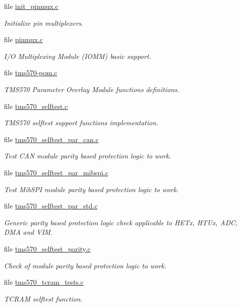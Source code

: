 \begin{DoxyCompactItemize}
file \mbox{\hyperlink{init__pinmux_8c}{init\+\_\+pinmux.\+c}}
\begin{DoxyCompactList}\small\item\em Initialize pin multiplexers. \end{DoxyCompactList}\item 
file \mbox{\hyperlink{pinmux_8c}{pinmux.\+c}}
\begin{DoxyCompactList}\small\item\em I/O Multiplexing Module (I\+O\+MM) basic support. \end{DoxyCompactList}\item 
file \mbox{\hyperlink{tms570-pom_8c}{tms570-\/pom.\+c}}
\begin{DoxyCompactList}\small\item\em T\+M\+S570 Parameter Overlay Module functions definitions. \end{DoxyCompactList}\item 
file \mbox{\hyperlink{tms570__selftest_8c}{tms570\+\_\+selftest.\+c}}
\begin{DoxyCompactList}\small\item\em T\+M\+S570 selftest support functions implementation. \end{DoxyCompactList}\item 
file \mbox{\hyperlink{tms570__selftest__par__can_8c}{tms570\+\_\+selftest\+\_\+par\+\_\+can.\+c}}
\begin{DoxyCompactList}\small\item\em Test C\+AN module parity based protection logic to work. \end{DoxyCompactList}\item 
file \mbox{\hyperlink{tms570__selftest__par__mibspi_8c}{tms570\+\_\+selftest\+\_\+par\+\_\+mibspi.\+c}}
\begin{DoxyCompactList}\small\item\em Test Mib\+S\+PI module parity based protection logic to work. \end{DoxyCompactList}\item 
file \mbox{\hyperlink{tms570__selftest__par__std_8c}{tms570\+\_\+selftest\+\_\+par\+\_\+std.\+c}}
\begin{DoxyCompactList}\small\item\em Generic parity based protection logic check applicable to H\+E\+Tx, H\+T\+Ux, A\+DC, D\+MA and V\+IM. \end{DoxyCompactList}\item 
file \mbox{\hyperlink{tms570__selftest__parity_8c}{tms570\+\_\+selftest\+\_\+parity.\+c}}
\begin{DoxyCompactList}\small\item\em Check of module parity based protection logic to work. \end{DoxyCompactList}\item 
file \mbox{\hyperlink{tms570__tcram__tests_8c}{tms570\+\_\+tcram\+\_\+tests.\+c}}
\begin{DoxyCompactList}\small\item\em T\+C\+R\+AM selftest function. \end{DoxyCompactList}\end{DoxyCompactItemize}

